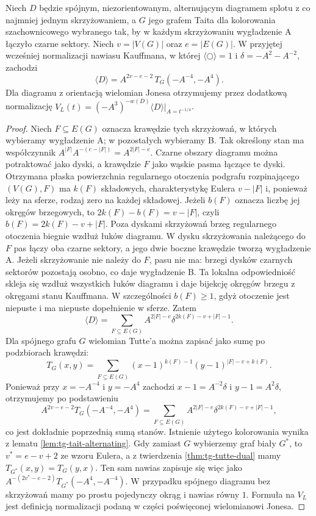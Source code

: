 \begin{twierdzenie}
\label{thm:tg-tait-tutte}
Niech $D$ będzie spójnym, niezorientowanym, alternującym
diagramem splotu z co najmniej jednym skrzyżowaniem,
a $G$ jego grafem Taita dla kolorowania
szachownicowego wybranego tak, by w każdym skrzyżowaniu
wygładzenie A łączyło czarne sektory. Niech
$v=|V(G)|$ oraz $e=|E(G)|$. W przyjętej wcześniej
normalizacji nawiasu Kauffmana, w której
$\langle\bigcirc\rangle=1$ i
$\delta=-A^2-A^{-2}$, zachodzi
\[
\langle D\rangle
=A^{2v-e-2}\,T_G(-A^{-4},-A^4).
\]
Dla diagramu z orientacją wielomian Jonesa otrzymujemy
przez dodatkową normalizację
$V_L(t)=(-A^3)^{-w(D)}\langle D\rangle\big|_{A=t^{-1/4}}$.
\end{twierdzenie}

\begin{proof}
Niech $F\subseteq E(G)$ oznacza krawędzie tych skrzyżowań,
w których wybieramy wygładzenie A; w pozostałych
wybieramy B. Tak określony stan ma współczynnik
$A^{|F|}A^{-(e-|F|)}=A^{2|F|-e}$.
Czarne obszary diagramu można potraktować jako dyski,
a krawędzie $F$ jako wąskie pasma łączące te dyski.
Otrzymana płaska powierzchnia regularnego otoczenia
podgrafu rozpinającego $(V(G),F)$ ma $k(F)$ składowych,
charakterystykę Eulera $v-|F|$ i, ponieważ leży na
sferze, rodzaj zero na każdej składowej. Jeżeli
$b(F)$ oznacza liczbę jej okręgów brzegowych, to
$2k(F)-b(F)=v-|F|$, czyli
$b(F)=2k(F)-v+|F|$.
Poza dyskami skrzyżowań brzeg regularnego otoczenia
biegnie wzdłuż łuków diagramu. W dysku skrzyżowania
należącego do $F$ pas łączy oba czarne sektory,
a jego dwie boczne krawędzie tworzą wygładzenie A.
Jeżeli skrzyżowanie nie należy do $F$, pasu nie ma:
brzegi dysków czarnych sektorów pozostają osobno,
co daje wygładzenie B. Ta lokalna odpowiedniość
skleja się wzdłuż wszystkich łuków diagramu i daje
bijekcję okręgów brzegu z okręgami stanu Kauffmana.
W szczególności $b(F)\geq1$, gdyż otoczenie jest
niepuste i ma niepuste dopełnienie w sferze.
Zatem
\[
\langle D\rangle=
\sum_{F\subseteq E(G)}
 A^{2|F|-e}\delta^{2k(F)-v+|F|-1}.
\]
Dla spójnego grafu $G$ wielomian Tutte'a można
zapisać jako sumę po podzbiorach krawędzi:
\[
T_G(x,y)=\sum_{F\subseteq E(G)}
(x-1)^{k(F)-1}(y-1)^{|F|-v+k(F)}.
\]
Ponieważ przy $x=-A^{-4}$ i $y=-A^4$ zachodzi
$x-1=A^{-2}\delta$ i $y-1=A^2\delta$,
otrzymujemy po podstawieniu
\[
A^{2v-e-2}T_G(-A^{-4},-A^4)
=\sum_{F\subseteq E(G)}
 A^{2|F|-e}\delta^{2k(F)-v+|F|-1},
\]
co jest dokładnie poprzednią sumą stanów.
Istnienie użytego kolorowania wynika z lematu
\ref{lem:tg-tait-alternating}. Gdy zamiast $G$ wybierzemy
graf biały $G^*$, to $v^*=e-v+2$ ze wzoru Eulera,
a z twierdzenia \ref{thm:tg-tutte-dual} mamy
$T_{G^*}(x,y)=T_G(y,x)$. Ten sam nawias zapisuje się więc
jako $A^{-(2v^*-e-2)}T_{G^*}(-A^4,-A^{-4})$.
W przypadku spójnego diagramu bez skrzyżowań mamy
po prostu pojedynczy okrąg i nawias równy $1$.
Formuła na $V_L$ jest definicją normalizacji
podaną w części poświęconej wielomianowi Jonesa.
\end{proof}

